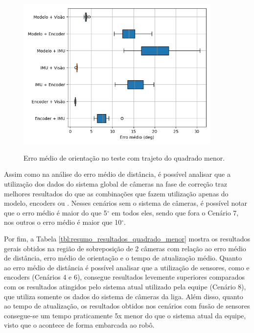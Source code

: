 \documentclass[acronym, symbols, table]{fei}
\begin{document}
	\begin{figure}[!htb]
		\centering
		\caption{Erro médio de orientação no teste com trajeto do quadrado menor.}
		\includegraphics[width=0.9\textwidth]{../Dados/Graficos-Resultados/erro_medio_orientacao_quadrado_menor.png}
		\label{fig:erro_medio_orientacao_quad_menor}
	\end{figure}

	Assim como na análise do erro médio de distância, é possível analisar que a utilização dos dados do sistema global de câmeras na fase de correção traz melhores resultados do que as combinações que fazem utilização apenas do modelo, encoders ou . Nesses cenários sem o sistema de câmeras, é possível notar que o erro médio é maior do que 5$^\circ$ em todos eles, sendo que fora o Cenário 7, nos outros o erro médio é maior que 10$^\circ$.

	Por fim, a Tabela \ref{tbl:resumo_resultados_quadrado_menor} mostra os resultados gerais obtidos na região de sobreposição de 2 câmeras com relação ao erro médio de distância, erro médio de orientação e o tempo de atualização médio. Quanto ao erro médio de distância é possível analisar que a utilização de sensores, como  e encoders (Cenários 4 e 6), consegue resultados levemente superiores comparados com os resultados atingidos pelo sistema atual utilizado pela equipe (Cenário 8), que utiliza somente os dados do sistema de câmeras da liga. Além disso, quanto ao tempo de atualização, os resultados obtidos nos cenários com fusão de sensores consegue-se um tempo praticamente 5x menor do que o sistema atual da equipe, visto que o  acontece de forma embarcada ao robô. 
\end{document}
